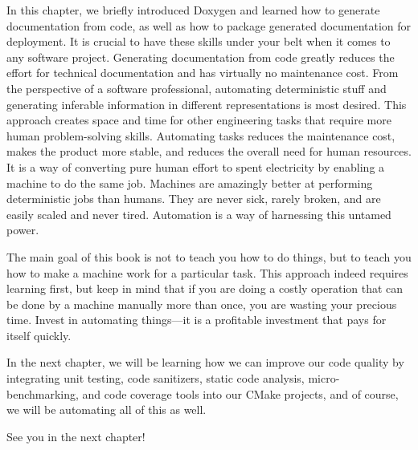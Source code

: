 In this chapter, we briefly introduced Doxygen and learned how to generate documentation from code, as well as how to package generated documentation for deployment. It is crucial to have these skills under your belt when it comes to any software project. Generating documentation from code greatly reduces the effort for technical documentation and has virtually no maintenance cost. From the perspective of a software professional, automating deterministic stuff and generating inferable information in different representations is most desired. This approach creates space and time for other engineering tasks that require more human problem-solving skills. Automating tasks reduces the maintenance cost, makes the product more stable, and reduces the overall need for human resources. It is a way of converting pure human effort to spent electricity by enabling a machine to do the same job. Machines are amazingly better at performing deterministic jobs than humans. They are never sick, rarely broken, and are easily scaled and never tired. Automation is a way of harnessing this untamed power.

The main goal of this book is not to teach you how to do things, but to teach you how to make a machine work for a particular task. This approach indeed requires learning first, but keep in mind that if you are doing a costly operation that can be done by a machine manually more than once, you are wasting your precious time. Invest in automating things—it is a profitable investment that pays for itself quickly.

In the next chapter, we will be learning how we can improve our code quality by integrating unit testing, code sanitizers, static code analysis, micro-benchmarking, and code coverage tools into our CMake projects, and of course, we will be automating all of this as well.

See you in the next chapter!